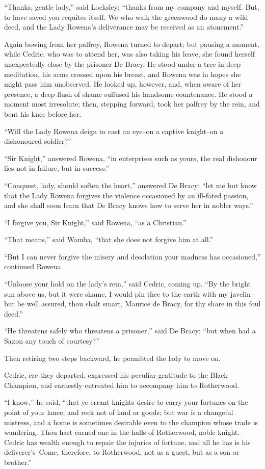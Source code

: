 ``Thanks, gentle lady,'' said Locksley; ``thanks from my company and
myself. But, to have saved you requites itself. We who walk the
greenwood do many a wild deed, and the Lady Rowena's deliverance may be
received as an atonement.''

Again bowing from her palfrey, Rowena turned to depart; but pausing a
moment, while Cedric, who was to attend her, was also taking his leave,
she found herself unexpectedly close by the prisoner De Bracy. He stood
under a tree in deep meditation, his arms crossed upon his breast, and
Rowena was in hopes she might pass him unobserved. He looked up,
however, and, when aware of her presence, a deep flush of shame suffused
his handsome countenance. He stood a moment most irresolute; then,
stepping forward, took her palfrey by the rein, and bent his knee before
her.

``Will the Lady Rowena deign to cast an eye--on a captive knight--on a
dishonoured soldier?''

``Sir Knight,'' answered Rowena, ``in enterprises such as yours, the
real dishonour lies not in failure, but in success.''

``Conquest, lady, should soften the heart,'' answered De Bracy; ``let me
but know that the Lady Rowena forgives the violence occasioned by an
ill-fated passion, and she shall soon learn that De Bracy knows how to
serve her in nobler ways.''

``I forgive you, Sir Knight,'' said Rowena, ``as a Christian.''

``That means,'' said Wamba, ``that she does not forgive him at all.''

``But I can never forgive the misery and desolation your madness has
occasioned,'' continued Rowena.

``Unloose your hold on the lady's rein,'' said Cedric, coming up. ``By
the bright sun above us, but it were shame, I would pin thee to the
earth with my javelin--but be well assured, thou shalt smart, Maurice de
Bracy, for thy share in this foul deed.''

``He threatens safely who threatens a prisoner,'' said De Bracy; ``but
when had a Saxon any touch of courtesy?''

Then retiring two steps backward, he permitted the lady to move on.

Cedric, ere they departed, expressed his peculiar gratitude to the Black
Champion, and earnestly entreated him to accompany him to Rotherwood.

``I know,'' he said, ``that ye errant knights desire to carry your
fortunes on the point of your lance, and reck not of land or goods; but
war is a changeful mistress, and a home is sometimes desirable even to
the champion whose trade is wandering. Thou hast earned one in the halls
of Rotherwood, noble knight. Cedric has wealth enough to repair the
injuries of fortune, and all he has is his deliverer's--Come, therefore,
to Rotherwood, not as a guest, but as a son or brother.''

